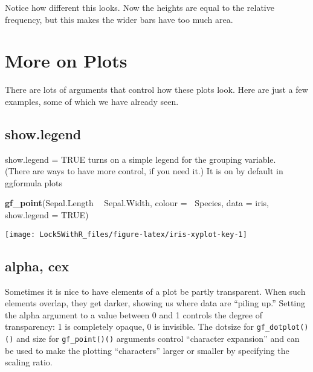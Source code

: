 \documentclass[]{book}
\newenvironment{Shaded}{\begin{snugshade}}{\end{snugshade}}
\newcommand{\DataTypeTok}[1]{\textcolor[rgb]{0.13,0.29,0.53}{#1}}
\newcommand{\KeywordTok}[1]{\textcolor[rgb]{0.13,0.29,0.53}{\textbf{#1}}}
\newcommand{\NormalTok}[1]{#1}
\newcommand{\OperatorTok}[1]{\textcolor[rgb]{0.81,0.36,0.00}{\textbf{#1}}}
\newcommand{\OtherTok}[1]{\textcolor[rgb]{0.56,0.35,0.01}{#1}}
\newcommand{\StringTok}[1]{\textcolor[rgb]{0.31,0.60,0.02}{#1}}
\begin{document}
Notice how different this looks. Now the heights are equal to the relative
frequency, but this makes the wider bars have too much area.

\hypertarget{more-on-plots}{%
\section{More on Plots}\label{more-on-plots}}

There are lots of arguments that control how these plots look. Here are just a
few examples, some of which we have already seen.

\hypertarget{show.legend}{%
\subsection{show.legend}\label{show.legend}}

{show.legend = TRUE} turns on a simple legend for the grouping variable.\\
(There are ways to have more control, if you need it.) It is on by default in ggformula plots

\begin{Shaded}
\begin{Highlighting}[]
\KeywordTok{gf_point}\NormalTok{(Sepal.Length }\OperatorTok{~}\StringTok{ }\NormalTok{Sepal.Width, }\DataTypeTok{colour =} \OperatorTok{~}\NormalTok{Species, }\DataTypeTok{data =}\NormalTok{ iris, }
    \DataTypeTok{show.legend =} \OtherTok{TRUE}\NormalTok{)}
\end{Highlighting}
\end{Shaded}

\texttt{[image: Lock5WithR\_files/figure-latex/iris-xyplot-key-1]}

\hypertarget{alpha-cex}{%
\subsection{alpha, cex}\label{alpha-cex}}

Sometimes it is nice to have elements of a plot be partly transparent. When
such elements overlap, they get darker, showing us where data are ``piling up.''
Setting the {alpha} argument to a value between 0 and 1 controls the
degree of transparency: 1 is completely opaque, 0 is invisible. The
{dotsize} for \texttt{gf\_dotplot()()} and {size} for \texttt{gf\_point()()} arguments control ``character expansion'' and can be used to make
the plotting ``characters'' larger or smaller by specifying the scaling ratio.
\end{document}
